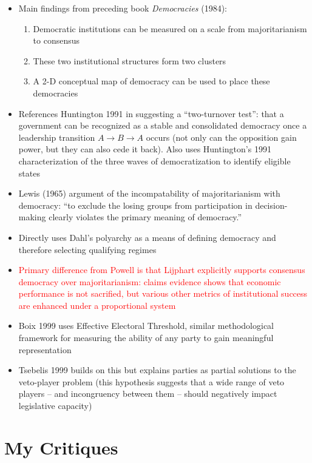 \documentclass[12pt]{article}
\begin{document}
\begin{itemize}
    \item Main findings from preceding book \emph{Democracies} (1984):
    \begin{enumerate}
        \item Democratic institutions can be measured on a scale from majoritarianism to consensus
        \item These two institutional structures form two clusters
        \item A 2-D conceptual map of democracy can be used to place these democracies
    \end{enumerate}
    \item References Huntington 1991 in suggesting a ``two-turnover test'': that a government can be recognized as a stable and consolidated democracy once a leadership transition $A \to B \to A$ occurs (not only can the opposition gain power, but they can also cede it back). Also uses Huntington's 1991 characterization of the three waves of democratization to identify eligible states
    \item Lewis (1965) argument of the incompatability of majoritarianism with democracy: ``to exclude the losing groups from participation in decision-making clearly violates the primary meaning of democracy.''
    \item Directly uses Dahl's polyarchy as a means of defining democracy and therefore selecting qualifying regimes
    \item \textcolor{red}{Primary difference from Powell is that Lijphart explicitly supports consensus democracy over majoritarianism: claims evidence shows that economic performance is not sacrified, but various other metrics of institutional success are enhanced under a proportional system}
    \item Boix 1999 uses Effective Electoral Threshold, similar methodological framework for measuring the ability of any party to gain meaningful representation
    \item Tsebelis 1999 builds on this but explains parties as partial solutions to the veto-player problem (this hypothesis suggests that a wide range of veto players -- and incongruency between them -- should negatively impact legislative capacity)
\end{itemize}


\section{My Critiques}
\end{document}
